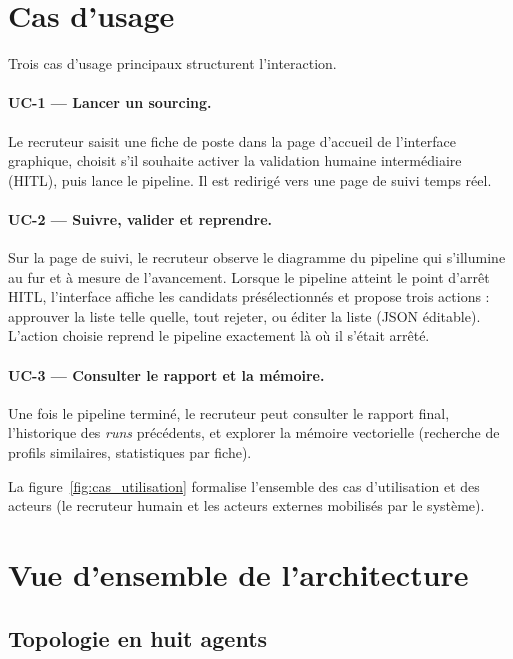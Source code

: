 \section{Cas d'usage}
\label{sec:cas_usage}

Trois cas d'usage principaux structurent l'interaction.

\paragraph{UC-1 — Lancer un sourcing.} Le recruteur saisit une fiche de poste dans la page d'accueil de l'interface graphique, choisit s'il souhaite activer la validation humaine intermédiaire (HITL), puis lance le pipeline. Il est redirigé vers une page de suivi temps réel.

\paragraph{UC-2 — Suivre, valider et reprendre.} Sur la page de suivi, le recruteur observe le diagramme du pipeline qui s'illumine au fur et à mesure de l'avancement. Lorsque le pipeline atteint le point d'arrêt HITL, l'interface affiche les candidats présélectionnés et propose trois actions : approuver la liste telle quelle, tout rejeter, ou éditer la liste (JSON éditable). L'action choisie reprend le pipeline exactement là où il s'était arrêté.

\paragraph{UC-3 — Consulter le rapport et la mémoire.} Une fois le pipeline terminé, le recruteur peut consulter le rapport final, l'historique des \emph{runs} précédents, et explorer la mémoire vectorielle (recherche de profils similaires, statistiques par fiche).

La figure~\ref{fig:cas_utilisation} formalise l'ensemble des cas d'utilisation et des acteurs (le recruteur humain et les acteurs externes mobilisés par le système).



\section{Vue d'ensemble de l'architecture}
\label{sec:archi_overview}

\subsection{Topologie en huit agents}

